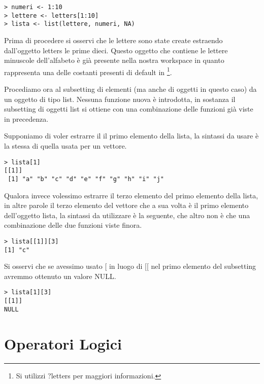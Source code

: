 \begin{lstlisting}
> numeri <- 1:10
> lettere <- letters[1:10]
> lista <- list(lettere, numeri, NA)
\end{lstlisting}

Prima di procedere si osservi che le lettere sono state create estraendo dall'oggetto \textsf{letters} le prime dieci. Questo oggetto che contiene le lettere minuscole dell'alfabeto è già presente nella nostra workspace in quanto rappresenta una delle costanti presenti di default in \erre\footnote{Si utilizzi ?letters per maggiori informazioni.}.

Procediamo ora al subsetting di elementi (ma anche di oggetti in questo caso) da un oggetto di tipo list. Nessuna funzione nuova è introdotta, in sostanza il subsetting di oggetti list si ottiene con una combinazione delle funzioni già viste in precedenza.

Supponiamo di voler estrarre il il primo elemento della lista, la sintassi da usare è la stessa di quella usata per un vettore.
\begin{lstlisting}
> lista[1]
[[1]]
 [1] "a" "b" "c" "d" "e" "f" "g" "h" "i" "j"
\end{lstlisting}
 
Qualora invece volessimo estrarre il terzo elemento del primo elemento della lista, in altre parole il terzo elemento del vettore che a sua volta è il primo elemento dell'oggetto lista, la sintassi da utilizzare è la seguente, che altro non è che una combinazione delle due funzioni viste finora.
\begin{lstlisting}
> lista[[1]][3]
[1] "c"
\end{lstlisting}

Si osservi che se avessimo usato \textsf{[} in luogo di \textsf{[[} nel primo elemento del subsetting avremmo ottenuto un valore NULL.
\begin{lstlisting}
> lista[1][3]
[[1]]
NULL
\end{lstlisting}
\section{Operatori Logici}
